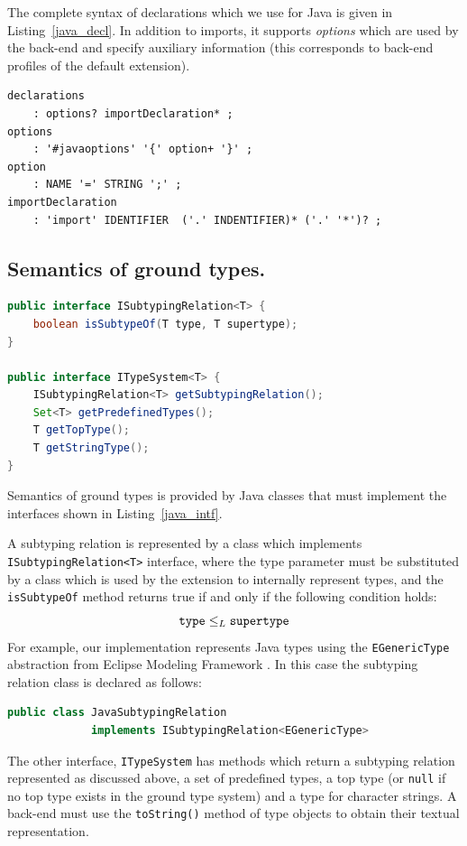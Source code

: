 \documentclass{informat} %
\newcommand{\lstref}[1]{Listing~\ref{#1}}
\begin{document}
The complete syntax of declarations which we use for Java is given in \lstref{java_decl}. In addition to imports, it supports \emph{options} which are used by the back-end and specify auxiliary information (this corresponds to back-end profiles of the default extension).
\begin{lstlisting}[caption=Declaration syntax for Java 5,label=java_decl,float]
declarations
	: options? importDeclaration* ;
options
	: '#javaoptions' '{' option+ '}' ;
option
	: NAME '=' STRING ';' ;
importDeclaration
	: 'import' IDENTIFIER  ('.' INDENTIFIER)* ('.' '*')? ;
\end{lstlisting}

\subsection{Semantics of ground types.}

\begin{lstlisting}[language=Java,caption=Java interfaces describing semantics of ground types,label=java_intf,float]
public interface ISubtypingRelation<T> {
	boolean isSubtypeOf(T type, T supertype);
}

public interface ITypeSystem<T> {
	ISubtypingRelation<T> getSubtypingRelation();
	Set<T> getPredefinedTypes();
	T getTopType();
	T getStringType();
}
\end{lstlisting}

Semantics of ground types is provided by Java classes that must implement the interfaces shown in \lstref{java_intf}.

A subtyping relation is represented by a class which implements \texttt{ISubtypingRelation<T>} interface, where the type parameter must be substituted by a class which is used by the extension to internally represent types, and the \texttt{isSubtypeOf} method returns true if and only if the following condition holds:
$$\mathtt{type} \le_L \mathtt{supertype}$$
For example, our implementation represents Java types using the \texttt{EGenericType} abstraction from Eclipse Modeling Framework \cite{EMF}. In this case the subtyping relation class is declared as follows:
\begin{lstlisting}[language=Java]
public class JavaSubtypingRelation 
		 	 implements ISubtypingRelation<EGenericType>
\end{lstlisting}

The other interface, \texttt{ITypeSystem} has methods which return a subtyping relation represented as discussed above, a set of predefined types, a top type (or \texttt{null} if no top type exists in the ground type system) and a type for character strings. A back-end must use the \texttt{toString()} method of type objects to obtain their textual representation.
\end{document}
